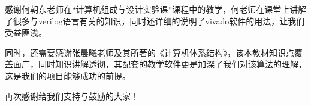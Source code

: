 \documentclass[twoside]{article}
\begin{document}
感谢何朝东老师在“计算机组成与设计实验课”课程中的教学，何老师在课堂上讲解了很多与verilog语言有关的知识，同时还详细的说明了vivado软件的用法，让我们受益匪浅。

同时，还需要感谢张晨曦老师及其所著的《计算机体系结构》，该本教材知识点覆盖面广，同时知识讲解透彻，其配套的教学软件更是加深了我们对该算法的理解，这是我们的项目能够成功的前提。

再次感谢给我们支持与鼓励的大家！




\end{document}
